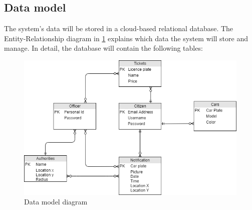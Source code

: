 \documentclass{article}
\begin{document}
	\subsection{Data model} The system's data will be stored in a cloud-based relational database. The Entity-Relationship diagram in \cref{fig:DataModel} explains which data the system will store and manage. In detail, the database will contain the following tables:
	\begin{figure}[h]
		\includegraphics[width=\linewidth]{images/Data_model_diagram.png}
		\caption{Data model diagram}
		\label{fig:DataModel}
	\end{figure}
	\FloatBarrier
\end{document}
